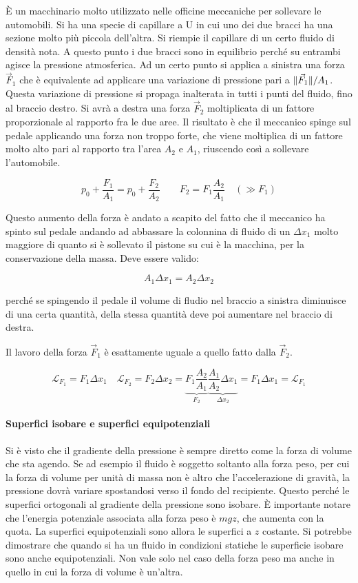 \FloatBarrier
È un macchinario molto utilizzato nelle officine meccaniche per sollevare le automobili.  Si ha una specie di capillare a U in cui uno dei due bracci ha una sezione molto più piccola dell'altra. Si riempie il capillare di un certo fluido di densità nota. A questo punto i due bracci sono in equilibrio perché su entrambi agisce la pressione atmosferica. Ad un certo punto si applica a sinistra una forza $\vec{F}_1$ che è equivalente ad applicare una variazione di pressione pari a $\lVert\vec{F}_1\rVert/A_1$. Questa variazione di pressione si propaga inalterata in tutti i punti del fluido, fino al braccio destro. Si avrà a destra una forza $\vec{F}_2$ moltiplicata di un fattore proporzionale al rapporto fra le due aree. Il risultato è che il meccanico spinge sul pedale applicando una forza non troppo forte, che viene moltiplica di un fattore molto alto pari al rapporto tra l'area $A_2$ e $A_1$, riuscendo così a sollevare l'automobile.

\[
	p_0+ \frac{F_1 }{A_1 } = p_0 + \frac{F_2 }{A_2 } \qquad F_2 = F_1\frac{A_2 }{A_1 } \quad (\gg F_1 )
\]

Questo aumento della forza è andato a scapito del fatto che il meccanico ha spinto sul pedale andando ad abbassare la colonnina di fluido di un $\Delta x_1$ molto maggiore di quanto si è sollevato il pistone su cui è la macchina, per la conservazione della massa. Deve essere valido:

\[
	A_1\Delta x_1 = A_2\Delta x_2
\]

perché se spingendo il pedale il volume di fludio nel braccio a sinistra diminuisce di una certa quantità, della stessa quantità deve poi aumentare nel braccio di destra.

Il lavoro della forza $\vec{F}_1$ è esattamente uguale a quello fatto dalla $\vec{F}_2$.

\[
	\mathcal{L}_{F_1 } = F_1 \Delta x_1 \quad \mathcal{L}_{F_2 } = F_2 \Delta x_2 = \underbrace{F_1\frac{A_2}{A_1} }_{F_2} \underbrace{\frac{A_1}{A_2}\Delta x_1}_{\Delta x_2 } = F_1 \Delta x_1 = \mathcal{L}_{F_1}
\]

\paragraph{Superfici isobare e superfici equipotenziali} Si è visto che il gradiente della pressione è sempre diretto come la forza di volume che sta agendo. Se ad esempio il fluido è soggetto soltanto alla forza peso, per cui la forza di volume per unità di massa non è altro che l'accelerazione di gravità, la pressione dovrà variare spostandosi verso il fondo del recipiente. Questo perché le superfici ortogonali al gradiente della pressione sono isobare. È importante notare che l'energia potenziale associata alla forza peso è $mgz$, che aumenta con la quota. La superfici equipotenziali sono allora le superfici a $z$ costante. Si potrebbe dimostrare che quando si ha un fluido in condizioni statiche le superficie isobare sono anche equipotenziali. Non vale solo nel caso della forza peso ma anche in quello in cui la forza di volume è un'altra.


